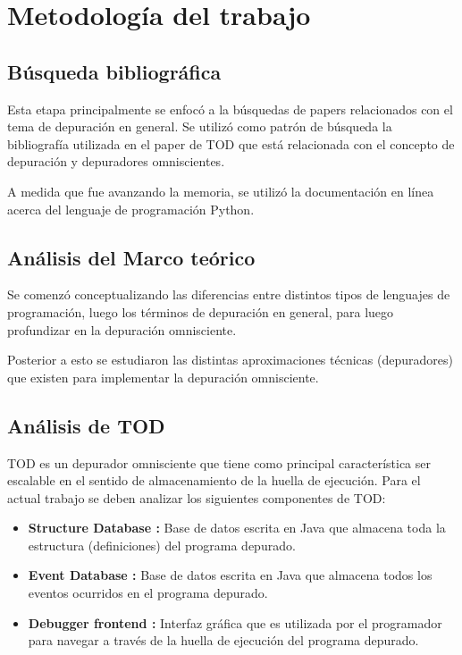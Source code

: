 \documentclass[12pt,legalpaper]{report}
\begin{document}
\chapter{Metodología del trabajo}
	\section{Búsqueda bibliográfica}

Esta etapa principalmente se enfocó a la búsquedas de papers relacionados con el tema de depuración en general.  Se utilizó como patrón de búsqueda la bibliografía utilizada en el paper de TOD \cite{tod} que está relacionada con el concepto de depuración y depuradores omniscientes.

A medida que fue avanzando la memoria, se utilizó la documentación en línea acerca del lenguaje de programación Python.

	\section{Análisis del Marco teórico}

Se comenzó conceptualizando las diferencias entre distintos tipos de lenguajes de programación, luego los términos de depuración en general, para luego profundizar en la depuración omnisciente.

Posterior a esto se estudiaron las distintas aproximaciones técnicas (depuradores) que existen para implementar la depuración omnisciente.


	\section{Análisis de TOD}

TOD es un depurador omnisciente que tiene como principal característica ser escalable en el sentido de almacenamiento de la huella de ejecución.  Para el actual trabajo se deben analizar los siguientes componentes de TOD:

\begin{itemize}
	\item \textbf{Structure Database :} Base de datos escrita en Java que almacena toda la estructura (definiciones) del programa depurado.
	\item \textbf{Event Database :} Base de datos escrita en Java que almacena todos los eventos ocurridos en el programa depurado.
	\item \textbf{Debugger frontend :} Interfaz gráfica que es utilizada por el programador para navegar a través de la huella de ejecución del programa depurado.
\end{itemize}
\end{document}

